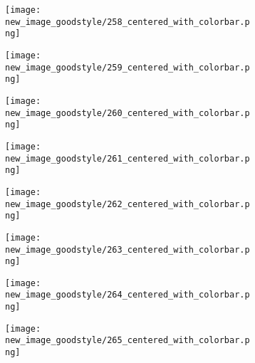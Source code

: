 \documentclass[a4paper,12pt]{article}
\begin{document}
\begin{figure}[H]
  \begin{subfigure}{0.11\textwidth}
    \texttt{[image: new\_image\_goodstyle/258\_centered\_with\_colorbar.png]}
  \end{subfigure}
  \hfill
  \begin{subfigure}{0.11\textwidth}
    \texttt{[image: new\_image\_goodstyle/259\_centered\_with\_colorbar.png]}
  \end{subfigure}
  \hfill
  \begin{subfigure}{0.11\textwidth}
    \texttt{[image: new\_image\_goodstyle/260\_centered\_with\_colorbar.png]}
  \end{subfigure}
  \hfill
  \begin{subfigure}{0.11\textwidth}
    \texttt{[image: new\_image\_goodstyle/261\_centered\_with\_colorbar.png]}
  \end{subfigure}
  \hfill
  \begin{subfigure}{0.11\textwidth}
    \texttt{[image: new\_image\_goodstyle/262\_centered\_with\_colorbar.png]}
  \end{subfigure}
  \hfill
  \begin{subfigure}{0.11\textwidth}
    \texttt{[image: new\_image\_goodstyle/263\_centered\_with\_colorbar.png]}
  \end{subfigure}
  \hfill
  \begin{subfigure}{0.11\textwidth}
    \texttt{[image: new\_image\_goodstyle/264\_centered\_with\_colorbar.png]}
  \end{subfigure}
  \hfill
  \begin{subfigure}{0.11\textwidth}
    \texttt{[image: new\_image\_goodstyle/265\_centered\_with\_colorbar.png]}
  \end{subfigure}
  \hfill
\end{figure}
\end{document}
